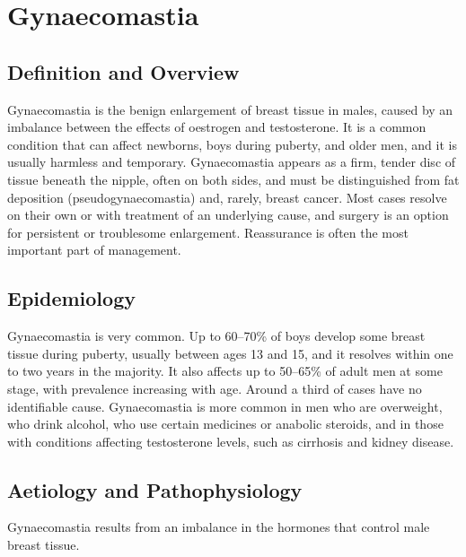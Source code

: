 \chapter{Gynaecomastia}

\section*{Definition and Overview}
Gynaecomastia is the benign enlargement of breast tissue in males, caused by an imbalance between the effects of oestrogen and testosterone. It is a common condition that can affect newborns, boys during puberty, and older men, and it is usually harmless and temporary. Gynaecomastia appears as a firm, tender disc of tissue beneath the nipple, often on both sides, and must be distinguished from fat deposition (pseudogynaecomastia) and, rarely, breast cancer. Most cases resolve on their own or with treatment of an underlying cause, and surgery is an option for persistent or troublesome enlargement. Reassurance is often the most important part of management.

\section*{Epidemiology}
Gynaecomastia is very common. Up to 60--70\% of boys develop some breast tissue during puberty, usually between ages 13 and 15, and it resolves within one to two years in the majority. It also affects up to 50--65\% of adult men at some stage, with prevalence increasing with age. Around a third of cases have no identifiable cause. Gynaecomastia is more common in men who are overweight, who drink alcohol, who use certain medicines or anabolic steroids, and in those with conditions affecting testosterone levels, such as cirrhosis and kidney disease.

\section*{Aetiology and Pathophysiology}
Gynaecomastia results from an imbalance in the hormones that control male breast tissue.

